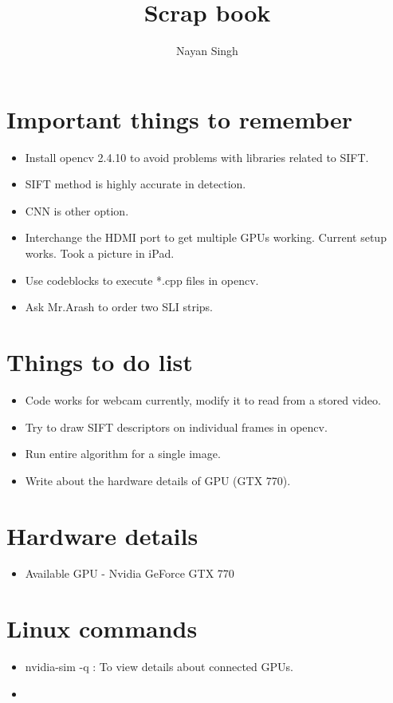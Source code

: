 \documentclass[]{article}
\title{Scrap book}
\author{Nayan Singh}
\begin{document}
\maketitle

\section{Important things to remember}
\begin{itemize}
\item Install opencv 2.4.10 to avoid problems with libraries related to SIFT. 
\item SIFT method is highly accurate in detection. 
\item CNN is other option. 
\item Interchange the HDMI port to get multiple GPUs working. Current setup works. Took a picture in iPad.
\item Use codeblocks to execute *.cpp files in opencv.
\item Ask Mr.Arash to order two SLI strips.
 
\end{itemize}

\section{Things to do list}
\begin{itemize}
\item Code works for webcam currently, modify it to read from a stored video.
\item Try to draw SIFT descriptors on individual frames in opencv.
\item Run entire algorithm for a single image.
\item Write about the hardware details of GPU (GTX 770). 
\end{itemize}

\section{Hardware details}
 \begin{itemize}
 \item Available GPU - Nvidia GeForce GTX 770
 \end{itemize}
 
\section{Linux commands}
 \begin{itemize}
  \item nvidia-sim -q : To view details about connected GPUs.
  \item 
 \end{itemize} 
  
\end{document}
